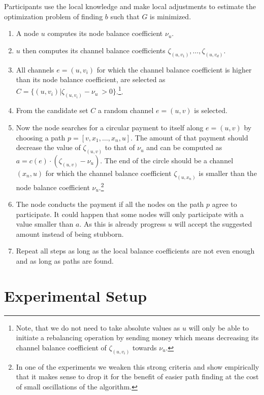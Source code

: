 \documentclass[conference]{IEEEtran}
\begin{document}
Participants use the local knowledge and make local adjustments to estimate the optimization problem of finding $b$ such that $G$ is minimized.
\begin{enumerate}
\item A node $u$ computes its node balance coefficient $\nu_u$.
\item $u$ then computes its channel balance coefficients $\zeta_{(u,v_1)},\dots,\zeta_{(u,v_d)}$.
\item All channels $e=(u,v_i)$ for which the channel balance coefficient is higher 
than its node balance coefficient, are selected as $C = \{(u,v_i) | \zeta_{(u,v_i)} - \nu_u\ > 0\}$.\footnote{
  Note, that we do not need to take absolute values as $u$ will only be able to initiate a rebalancing operation by sending money which means decreasing its channel balance coefficient of $\zeta_{(u,v_i)}$ towards $\nu_u$.}.
\item From the candidate set $C$ a random channel $e=(u,v)$ is selected.
\item Now the node searches for a circular payment to itself along $e=(u,v)$ by choosing a path $p = [v,x_1,\dots,x_n,u]$. The amount of that payment should decrease the value of $\zeta_{(u,v)}$ to that of $\nu_u$ and can be computed as $a = c(e)\cdot (\zeta_{(u,v)}-\nu_u)$. The end of the circle should be a channel $(x_n,u)$ for which the channel balance coefficient $\zeta_{(u,x_n)}$ is smaller than the node balance coefficient $\nu_u$.\footnote{In one of the experiments we weaken this strong criteria and show empirically that it makes sense to drop it for the benefit of easier path finding at the cost of small oscillations of the algorithm.}
\item The node conducts the payment if all the nodes on the path $p$ agree to participate. It could happen that some nodes will only participate with a value smaller than $a$. As this is already progress $u$ will accept the suggested amount instead of being stubborn. 
\item Repeat all steps as long as the local balance coefficients are not even enough and as long as paths are found.
\end{enumerate}

\section{Experimental Setup}
\label{sec:setup}
\end{document}
